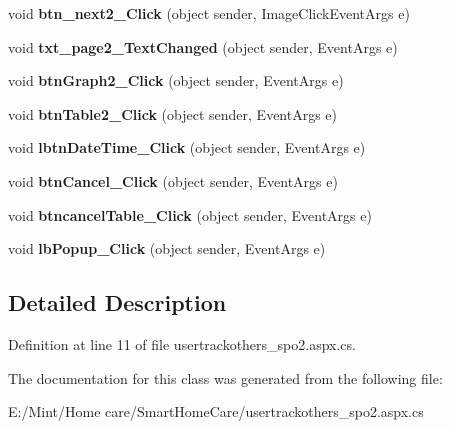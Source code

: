 \begin{DoxyCompactItemize}
\item 
\hypertarget{classusertrackothers__spo2_a83f43bed57fab6afba6360c0d6d68a71}{void {\bfseries btn\-\_\-next2\-\_\-\-Click} (object sender, Image\-Click\-Event\-Args e)}\label{classusertrackothers__spo2_a83f43bed57fab6afba6360c0d6d68a71}

\item 
\hypertarget{classusertrackothers__spo2_af2fcb8b9237904c82ffa5117645a6a0c}{void {\bfseries txt\-\_\-page2\-\_\-\-Text\-Changed} (object sender, Event\-Args e)}\label{classusertrackothers__spo2_af2fcb8b9237904c82ffa5117645a6a0c}

\item 
\hypertarget{classusertrackothers__spo2_a664c9ba8b9c01daac1ceda753af5679b}{void {\bfseries btn\-Graph2\-\_\-\-Click} (object sender, Event\-Args e)}\label{classusertrackothers__spo2_a664c9ba8b9c01daac1ceda753af5679b}

\item 
\hypertarget{classusertrackothers__spo2_af2ed41a683a94d2eaf48c4dd47644140}{void {\bfseries btn\-Table2\-\_\-\-Click} (object sender, Event\-Args e)}\label{classusertrackothers__spo2_af2ed41a683a94d2eaf48c4dd47644140}

\item 
\hypertarget{classusertrackothers__spo2_a7587c477fe10bec102e6d16647c8ce23}{void {\bfseries lbtn\-Date\-Time\-\_\-\-Click} (object sender, Event\-Args e)}\label{classusertrackothers__spo2_a7587c477fe10bec102e6d16647c8ce23}

\item 
\hypertarget{classusertrackothers__spo2_afeed45a6622ec4efa0f0e6ced9592c93}{void {\bfseries btn\-Cancel\-\_\-\-Click} (object sender, Event\-Args e)}\label{classusertrackothers__spo2_afeed45a6622ec4efa0f0e6ced9592c93}

\item 
\hypertarget{classusertrackothers__spo2_a3b71fc4044cc4a9e963344f1981bff5a}{void {\bfseries btncancel\-Table\-\_\-\-Click} (object sender, Event\-Args e)}\label{classusertrackothers__spo2_a3b71fc4044cc4a9e963344f1981bff5a}

\item 
\hypertarget{classusertrackothers__spo2_af5f7e73c94610d70c1f33ef4b3e31f2a}{void {\bfseries lb\-Popup\-\_\-\-Click} (object sender, Event\-Args e)}\label{classusertrackothers__spo2_af5f7e73c94610d70c1f33ef4b3e31f2a}

\end{DoxyCompactItemize}


\subsection{Detailed Description}


Definition at line 11 of file usertrackothers\-\_\-spo2.\-aspx.\-cs.



The documentation for this class was generated from the following file\-:\begin{DoxyCompactItemize}
\item 
E\-:/\-Mint/\-Home care/\-Smart\-Home\-Care/usertrackothers\-\_\-spo2.\-aspx.\-cs\end{DoxyCompactItemize}
